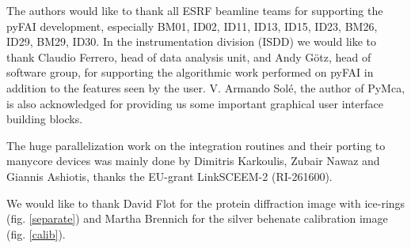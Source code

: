 \documentclass[preprint]{iucr}
\begin{document}

The authors would like to thank all ESRF beamline teams for supporting the
pyFAI development, especially BM01, ID02, ID11, ID13, ID15, ID23, BM26, ID29, BM29,
ID30. In the instrumentation division (ISDD) we would like to thank Claudio
Ferrero, head of data analysis unit, and Andy G\"otz, head of software group, for
supporting the algorithmic work performed on pyFAI in addition to the features
seen by the user.
V. Armando Solé, the author of PyMca, is also acknowledged for providing us some
important graphical user interface building blocks.
  
The huge parallelization work on the integration routines and their porting to
manycore devices was mainly done by Dimitris Karkoulis, Zubair Nawaz and Giannis Ashiotis,
thanks the EU-grant LinkSCEEM-2 (RI-261600).

We would like to thank David Flot for the protein
diffraction image with ice-rings (fig. \ref{separate}) and Martha Brennich for
the silver behenate calibration image (fig. \ref{calib}).
\end{document}
